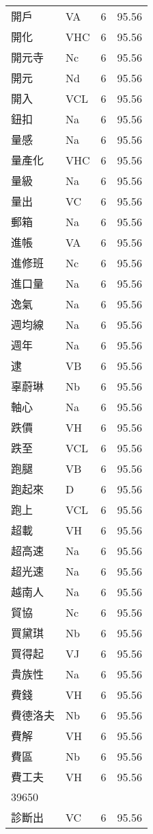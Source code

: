 \documentclass[twocolumn]{book}
\begin{document}
\begin{supertabular}{llrr}
開戶 & VA & 6 &  95.56\\
開化 & VHC & 6 &  95.56\\
開元寺 & Nc & 6 &  95.56\\
開元 & Nd & 6 &  95.56\\
開入 & VCL & 6 &  95.56\\
鈕扣 & Na & 6 &  95.56\\
量感 & Na & 6 &  95.56\\
量產化 & VHC & 6 &  95.56\\
量級 & Na & 6 &  95.56\\
量出 & VC & 6 &  95.56\\
郵箱 & Na & 6 &  95.56\\
進帳 & VA & 6 &  95.56\\
進修班 & Nc & 6 &  95.56\\
進口量 & Na & 6 &  95.56\\
逸氣 & Na & 6 &  95.56\\
週均線 & Na & 6 &  95.56\\
週年 & Na & 6 &  95.56\\
逮 & VB & 6 &  95.56\\
辜蔚琳 & Nb & 6 &  95.56\\
軸心 & Na & 6 &  95.56\\
跌價 & VH & 6 &  95.56\\
跌至 & VCL & 6 &  95.56\\
跑腿 & VB & 6 &  95.56\\
跑起來 & D & 6 &  95.56\\
跑上 & VCL & 6 &  95.56\\
超載 & VH & 6 &  95.56\\
超高速 & Na & 6 &  95.56\\
超光速 & Na & 6 &  95.56\\
越南人 & Na & 6 &  95.56\\
貿協 & Nc & 6 &  95.56\\
買黛琪 & Nb & 6 &  95.56\\
買得起 & VJ & 6 &  95.56\\
貴族性 & Na & 6 &  95.56\\
費錢 & VH & 6 &  95.56\\
費德洛夫 & Nb & 6 &  95.56\\
費解 & VH & 6 &  95.56\\
費區 & Nb & 6 &  95.56\\
費工夫 & VH & 6 &  95.56\\
39650\\
診斷出 & VC & 6 &  95.56\\

\end{supertabular}
\end{document}
